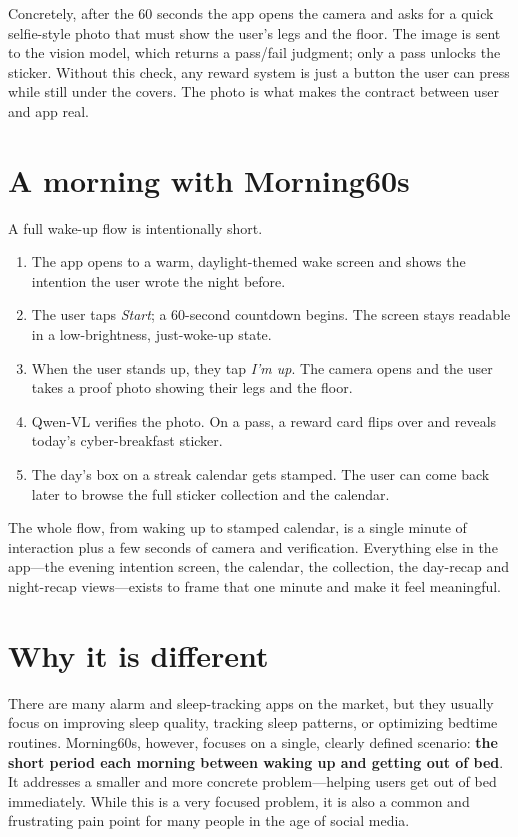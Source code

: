 \documentclass[manuscript,anonymous,review]{acmart}
\begin{document}
Concretely, after the 60 seconds the app opens the camera and asks for a quick selfie-style photo that must show the user's legs and the floor. The image is sent to the vision model, which returns a pass/fail judgment; only a pass unlocks the sticker. Without this check, any reward system is just a button the user can press while still under the covers. The photo is what makes the contract between user and app real.

\section{A morning with Morning60s}
A full wake-up flow is intentionally short.
\begin{enumerate}
  \item The app opens to a warm, daylight-themed wake screen and shows the intention the user wrote the night before.
  \item The user taps \emph{Start}; a 60-second countdown begins. The screen stays readable in a low-brightness, just-woke-up state.
  \item When the user stands up, they tap \emph{I'm up}. The camera opens and the user takes a proof photo showing their legs and the floor.
  \item Qwen-VL verifies the photo. On a pass, a reward card flips over and reveals today's cyber-breakfast sticker.
  \item The day's box on a streak calendar gets stamped. The user can come back later to browse the full sticker collection and the calendar.
\end{enumerate}
The whole flow, from waking up to stamped calendar, is a single minute of interaction plus a few seconds of camera and verification. Everything else in the app---the evening intention screen, the calendar, the collection, the day-recap and night-recap views---exists to frame that one minute and make it feel meaningful.

\section{Why it is different}
There are many alarm and sleep-tracking apps on the market, but they usually focus on improving sleep quality, tracking sleep patterns, or optimizing bedtime routines. Morning60s, however, focuses on a single, clearly defined scenario: \textbf{the short period each morning between waking up and getting out of bed}. It addresses a smaller and more concrete problem---helping users get out of bed immediately. While this is a very focused problem, it is also a common and frustrating pain point for many people in the age of social media.
\end{document}
